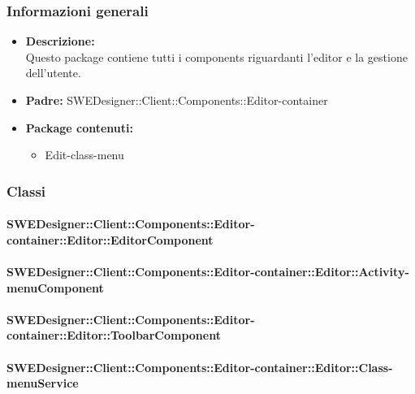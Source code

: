 		\subsubsection{Informazioni generali}
			\begin{itemize}
          		\item \textbf{Descrizione:}\\
          		Questo package contiene tutti i components riguardanti l'editor e la gestione dell'utente.
          		\item \textbf{Padre:} SWEDesigner::Client::Components::Editor-container
          		\item \textbf{Package contenuti:}\\
          		\begin{itemize}
          			\item Edit-class-menu\\
          		\end{itemize}
          	\end{itemize}
          	
		\subsubsection{Classi}
		
			\paragraph{SWEDesigner::Client::Components::Editor-container::Editor::EditorComponent}
				
				
			\paragraph{SWEDesigner::Client::Components::Editor-container::Editor::Activity-menuComponent}
				
				
			\paragraph{SWEDesigner::Client::Components::Editor-container::Editor::ToolbarComponent}
				
				
			\paragraph{SWEDesigner::Client::Components::Editor-container::Editor::Class-menuService}
				
				
